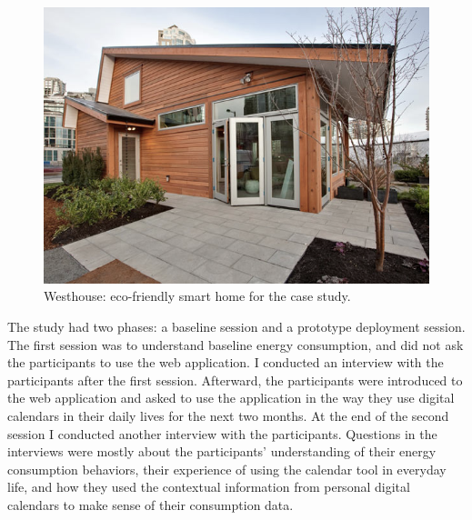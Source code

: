 \documentclass[12pt,oneside]{book}
\begin{document}
\begin{figure}[h]
\centering
\includegraphics[width=\columnwidth]{figures/westhouse}
\caption{Westhouse: eco-friendly smart home for the case study. }
\label{fig:westhouse}
\end{figure}

The study had two phases: a baseline session and a prototype deployment session.  The first session was to understand baseline energy consumption, and did not ask the participants to use the web application.  I conducted an interview with the participants after the first session.  Afterward, the participants were introduced to the web application and asked to use the application in the way they use digital calendars in their daily lives for the next two months.  At the end of the second session I conducted another interview with the participants.  Questions in the interviews were mostly about the participants' understanding of their energy consumption behaviors, their experience of using the calendar tool in everyday life, and how they used the contextual information from personal digital calendars to make sense of their consumption data.
\end{document}
